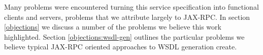 Many problems were encountered turning this service specification into
functional clients and servers, problems that we attribute largely to
JAX-RPC. In section \ref{objections} we discuss a number of the
problems we believe this work highlighted. Section
\ref{objections:wsdl-gen} outlines the particular problems we believe
typical JAX-RPC oriented approaches to WSDL generation create.





